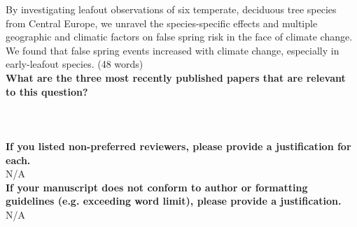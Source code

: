 \documentclass{article}\usepackage[]{graphicx}\usepackage[]{color}
\begin{document}
\noindent By investigating leafout observations of six temperate, deciduous tree species from Central Europe, we unravel the species-specific effects and multiple geographic and climatic factors on false spring risk in the face of climate change. We found that false spring events increased with climate change, especially in early-leafout species. (48 words) \\ 

\noindent \textbf{What are the three most recently published papers that are relevant to this question?} \\

\\
\\ 
\\

\noindent \textbf{ If you listed non-preferred reviewers, please provide a justification for each.} \\

\noindent N/A \\

\noindent \textbf{ If your manuscript does not conform to author or formatting guidelines (e.g. exceeding word limit), please provide a justification.} \\

\noindent N/A \\


\end{document}
